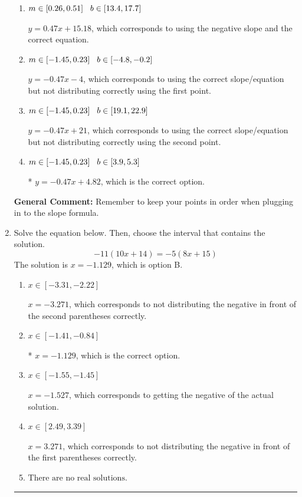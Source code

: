 \documentclass{extbook}[14pt]
\newcommand{\litem}[1]{\item #1

\rule{\textwidth}{0.4pt}}
\begin{document}
\begin{enumerate}
{\begin{enumerate}[label=\Alph*.]
 $y = -0.47x -4.82$, which corresponds to using the correct slope and getting the negative y-intercept.
\item \( m \in [0.26, 0.51] \hspace*{3mm} b \in [13.4, 17.7] \)

 $y = 0.47x + 15.18$, which corresponds to using the negative slope and the correct equation.
\item \( m \in [-1.45, 0.23] \hspace*{3mm} b \in [-4.8, -0.2] \)

 $y = -0.47x -4$, which corresponds to using the correct slope/equation but not distributing correctly using the first point.
\item \( m \in [-1.45, 0.23] \hspace*{3mm} b \in [19.1, 22.9] \)

 $y = -0.47x + 21$, which corresponds to using the correct slope/equation but not distributing correctly using the second point.
\item \( m \in [-1.45, 0.23] \hspace*{3mm} b \in [3.9, 5.3] \)

* $y = -0.47x + 4.82$, which is the correct option.
\end{enumerate}

\textbf{General Comment:} Remember to keep your points in order when plugging in to the slope formula.
}
\litem{
Solve the equation below. Then, choose the interval that contains the solution.
\[ -11(10x + 14) = -5(8x + 15) \]
The solution is \( x = -1.129 \), which is option B.\begin{enumerate}[label=\Alph*.]
\item \( x \in [-3.31, -2.22] \)

$x = -3.271$, which corresponds to not distributing the negative in front of the second parentheses correctly.
\item \( x \in [-1.41, -0.84] \)

* $x = -1.129$, which is the correct option.
\item \( x \in [-1.55, -1.45] \)

$x = -1.527$, which corresponds to getting the negative of the actual solution.
\item \( x \in [2.49, 3.39] \)

$x = 3.271$, which corresponds to not distributing the negative in front of the first parentheses correctly.
\item \( \text{There are no real solutions.} \)


\end{enumerate}}
\end{enumerate}
\end{document}
